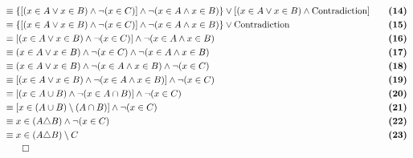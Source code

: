 \begin{alignat*}{2}
&\equiv \{[(x \in A \vee x \in B) \wedge \neg (x \in C)] \wedge \neg (x \in A \wedge x \in B)\} \vee [(x \in A \vee x \in B) \wedge \text{Contradiction}] && \quad \textbf{(14)}\\
&\equiv \{[(x \in A \vee x \in B) \wedge \neg (x \in C)] \wedge \neg (x \in A \wedge x \in B)\} \vee \text{Contradiction} && \quad \textbf{(15)}\\
&\equiv [(x \in A \vee x \in B) \wedge \neg (x \in C)] \wedge \neg (x \in A \wedge x \in B) && \quad \textbf{(16)}\\
&\equiv (x \in A \vee x \in B) \wedge \neg (x \in C) \wedge \neg (x \in A \wedge x \in B) && \quad \textbf{(17)}\\
&\equiv (x \in A \vee x \in B) \wedge \neg (x \in A \wedge x \in B) \wedge \neg (x \in C) && \quad \textbf{(18)}\\
&\equiv [(x \in A \vee x \in B) \wedge \neg (x \in A \wedge x \in B)] \wedge \neg (x \in C) && \quad \textbf{(19)}\\
&\equiv [(x \in A \cup B) \wedge \neg (x \in A \cap B)] \wedge \neg (x \in C) && \quad \textbf{(20)}\\
&\equiv [x \in (A \cup B) \setminus (A \cap B)] \wedge \neg (x \in C) && \quad \textbf{(21)}\\
&\equiv x \in (A \triangle B) \wedge \neg (x \in C) && \quad \textbf{(22)}\\
&\equiv x \in (A \triangle B) \setminus C && \quad \textbf{(23)}\\
&\qed
\end{alignat*}
\pagebreak


